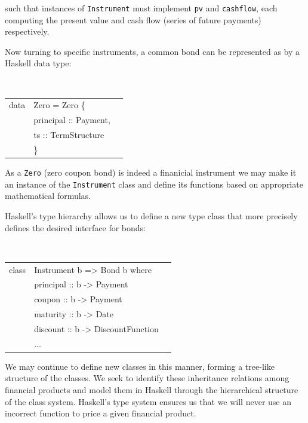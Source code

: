 \documentclass[11pt]{article}
\begin{document}
such that instances of {\tt Instrument} must implement {\tt pv} and {\tt cashflow}, each
computing the present value and cash flow (series of future payments) respectively.

Now turning to specific instruments, a common bond can be represented as by a
Haskell data type:

\begin{center}
\tt
\begin{tabular}{lll}
data & Zero = Zero \{\\
      &\hspace{-1cm} principal :: Payment,\\
      &\hspace{-1cm} ts :: TermStructure\\
      &\hspace{-0.8cm}\}
\end{tabular}
\end{center}

As a {\tt Zero} (zero coupon bond) is indeed a finanicial instrument we may make it an instance of
the {\tt Instrument} class and define its functions based on appropriate mathematical
formulas.

Haskell's type hierarchy allows us to define a new type class that more precisely
defines the desired interface for bonds:

\begin{center}
\tt
\begin{tabular}{lll}
class & Instrument b => Bond b where\\
      &\hspace{-1cm} principal :: b -> Payment\\
      &\hspace{-1cm} coupon    :: b -> Payment\\
      &\hspace{-1cm} maturity  :: b -> Date\\
      &\hspace{-1cm} discount  :: b -> DiscountFunction\\
      &\hspace{-1cm} ...\\
\end{tabular}
\end{center}

We may continue to define new classes in this manner, forming a tree-like
structure of the classes. We seek to identify these inheritance relations among
financial products and model them in Haskell through the hierarchical structure
of the class system.
Haskell's type system ensures us that we will never use an incorrect
function to price a given financial product.\\
\end{document}
